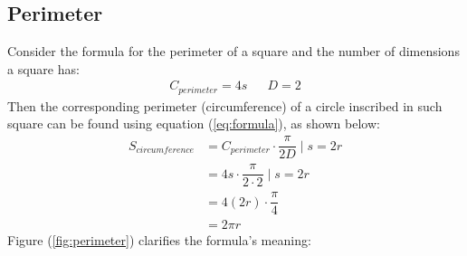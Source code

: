 \documentclass[12pt,letterpaper,twocolumn]{article}
\begin{document}
\subsection*{Perimeter}
Consider the formula for the perimeter of a square and the number of dimensions a square has:
	\begin{align}
		C_{perimeter} = 4s && D =  2
	\end{align}	
Then the corresponding perimeter (circumference) of a circle inscribed in such square can be found using equation (\ref{eq:formula}), as shown below:
	\begin{align*}
		S_{circumference} &= C_{perimeter} \cdot\dfrac{\pi}{2D} \mid  s=2r \\
		&= 4s \cdot\dfrac{\pi}{2\cdot 2} \mid s=2r\\
		&= 4(2r) \cdot\dfrac{\pi}{4} \\
		&= 2 \pi r
	\end{align*}
Figure (\ref{fig:perimeter}) clarifies the formula's meaning:
	
% 
\end{document}
